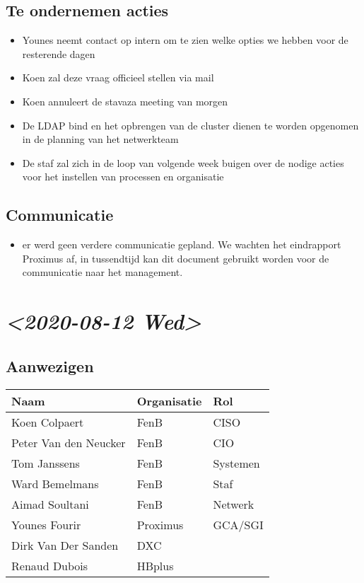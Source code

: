 \documentclass[11pt]{article}
\begin{document}
\subsection{Te ondernemen acties}
\label{sec:org4f7a74e}
\begin{itemize}
\item Younes neemt contact op intern om te zien welke opties we hebben voor de resterende dagen
\item Koen zal deze vraag officieel stellen via mail
\item Koen annuleert de stavaza meeting van morgen
\item De LDAP bind en het opbrengen van de cluster dienen te worden opgenomen in de planning van het netwerkteam
\item De staf zal zich in de loop van volgende week buigen over de nodige acties voor het instellen van processen en organisatie
\end{itemize}

\subsection{Communicatie}
\label{sec:orgbf285a0}

\begin{itemize}
\item er werd geen verdere communicatie gepland. We wachten het eindrapport Proximus af, in tussendtijd kan dit document gebruikt worden voor de communicatie naar het management.
\end{itemize}

\section{\textit{<2020-08-12 Wed>}}
\label{sec:orgb12b9df}

\subsection{Aanwezigen}
\label{sec:orge3f5bb4}

\begin{center}
\begin{tabular}{lll}
Naam & Organisatie & Rol\\
\hline
Koen Colpaert & FenB & CISO\\
Peter Van den Neucker & FenB & CIO\\
Tom Janssens & FenB & Systemen\\
Ward Bemelmans & FenB & Staf\\
Aimad Soultani & FenB & Netwerk\\
Younes Fourir & Proximus & GCA/SGI\\
Dirk Van Der Sanden & DXC & \\
Renaud Dubois & HBplus & \\
\end{tabular}
\end{center}
\end{document}
